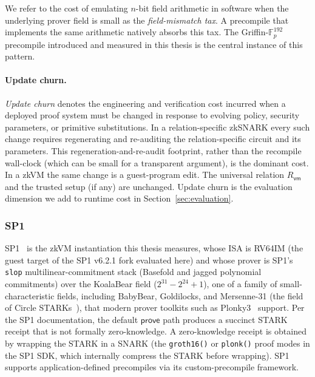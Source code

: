 We refer to the cost of emulating $n$-bit field arithmetic in software when the underlying prover field is small as the \emph{field-mismatch tax}. A precompile that implements the same arithmetic natively absorbs this tax. The Griffin-$\mathbb{F}_p^{192}$ precompile introduced and measured in this thesis is the central instance of this pattern.

\paragraph{Update churn.}
\emph{Update churn} denotes the engineering and verification cost incurred when a deployed proof system must be changed in response to evolving policy, security parameters, or primitive substitutions. In a relation-specific zkSNARK every such change requires regenerating and re-auditing the relation-specific circuit and its parameters. This regeneration-and-re-audit footprint, rather than the recompile wall-clock (which can be small for a transparent argument), is the dominant cost. In a zkVM the same change is a guest-program edit. The universal relation $R_{\mathsf{vm}}$ and the trusted setup (if any) are unchanged. Update churn is the evaluation dimension we add to runtime cost in Section~\ref{sec:evaluation}.

\subsubsection{SP1}
SP1~\cite{succinct2024sp1} is the zkVM instantiation this thesis measures, whose ISA is RV64IM (the guest target of the SP1 v6.2.1 fork evaluated here) and whose prover is SP1's \texttt{slop} multilinear-commitment stack (Basefold and jagged polynomial commitments) over the KoalaBear field ($2^{31}-2^{24}+1$), one of a family of small-characteristic fields, including BabyBear, Goldilocks, and Mersenne-31 (the field of Circle STARKs~\cite{circlestarks2024}), that modern prover toolkits such as Plonky3~\cite{plonky3} support. Per the SP1 documentation, the default $\mathsf{prove}$ path produces a succinct STARK receipt that is not formally zero-knowledge. A zero-knowledge receipt is obtained by wrapping the STARK in a SNARK (the \texttt{groth16()} or \texttt{plonk()} proof modes in the SP1 SDK, which internally compress the STARK before wrapping). SP1 supports application-defined precompiles via its custom-precompile framework.

